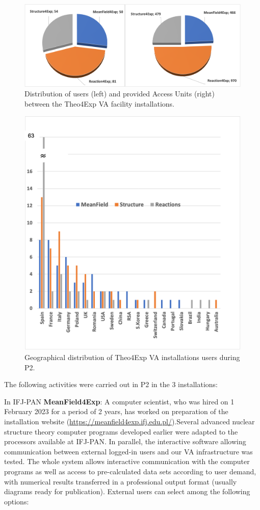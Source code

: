 \begin{figure}[!h]
    \centering
    \includegraphics[width=1.0\linewidth]{graphics/WP2_VA_statistics.png}
    \caption{Distribution of users (left) and provided Access Units (right) between the Theo4Exp VA facility installations.}
    \label{fig:WP2_VA_statistics}
\end{figure}

\begin{figure}[!h]
    \centering
    \includegraphics[width=0.85\linewidth]{graphics/VA_countries.png}
    \caption{Geographical distribution of Theo4Exp VA installations users during P2.}
    \label{fig:VA_countries}
\end{figure}
The following activities were carried out in P2 in the 3 installations:

In IFJ-PAN \textbf{MeanField4Exp}: A computer scientist, who was hired on 1 February 2023 for a period of 2 years, has worked on preparation of the installation website (\url{https://meanfield4exp.ifj.edu.pl/}).Several advanced nuclear structure theory computer programs developed earlier were adapted to the processors available at IFJ-PAN. In parallel, the interactive software allowing communication between external logged-in users and our VA infrastructure was tested. The whole system allows interactive communication with the computer programs as well as access to pre-calculated data sets according to user demand, with numerical results transferred in a professional output format (usually diagrams ready for publication). External users can select among the following options:

